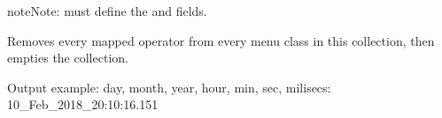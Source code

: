 \documentclass[letterpaper,10pt,english,openany,oneside]{sphinxmanual}
\begin{document}
\begin{fulllineitems}
\begin{fulllineitems}
\begin{quote}
\begin{description}
\begin{itemize}
\end{itemize}

\end{description}\end{quote}

\begin{sphinxadmonition}{note}{Note:}
 must define the  and  fields.
\end{sphinxadmonition}

\end{fulllineitems}


\begin{fulllineitems}
\label{\detokenize{io_anim_mvnx:io_anim_mvnx.utils.OperatorToMenuManager.unregister}}
Removes every mapped operator from every menu class in this collection,
then empties the collection.

\end{fulllineitems}


\end{fulllineitems}


\begin{fulllineitems}
\label{\detokenize{io_anim_mvnx:io_anim_mvnx.utils.make_timestamp}}
Output example: day, month, year, hour, min, sec, milisecs:
10\_Feb\_2018\_20:10:16.151

\end{fulllineitems}

\end{document}
